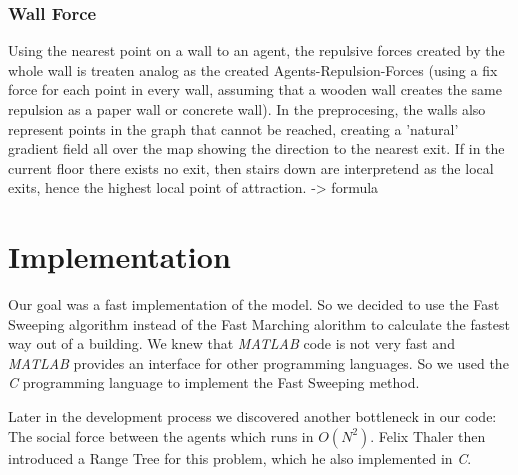 \documentclass[11pt]{article}
\begin{document}

\subsubsection{Wall Force}

Using the nearest point on a wall to an agent, the repulsive forces created by
the whole wall is treaten analog as the created Agents-Repulsion-Forces (using a
fix force for each point in every wall, assuming that a wooden wall creates the
same repulsion as a paper wall or concrete wall). In the preprocesing, the walls
also represent points in the graph that cannot be reached, creating a 'natural'
gradient field all over the map showing the direction to the nearest exit. If in
the current floor there exists no exit, then stairs down are interpretend as the
local exits, hence the highest local point of attraction. \cite{SFMPD} 
-> formula



\section{Implementation}
Our goal was a fast implementation of the model. So we decided to use the Fast
Sweeping algorithm instead of the Fast Marching alorithm to calculate the
fastest way out of a building. We knew that \textit{MATLAB} code is not very fast and
\textit{MATLAB} provides an interface for other programming languages. So we
used the \textit{C} programming language to implement the Fast Sweeping method.

Later in the development process we discovered another bottleneck in our code:
The social force between the agents which runs in $ O(N^2) $. Felix Thaler then
introduced a Range Tree for this problem, which he also implemented in
\textit{C}.

\end{document}
